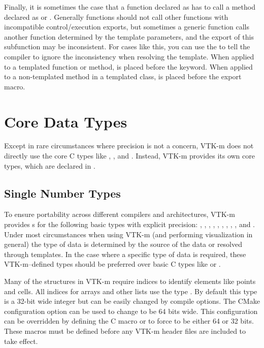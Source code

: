 Finally, it is sometimes the case that a function declared as
\vtkmexeccontexport has to call a method declared as \vtkmexecexport or
\vtkmcontexport. Generally functions should not call other functions with
incompatible control/execution exports, but sometimes a generic
\vtkmexeccontexport function calls another function determined by the
template parameters, and the export of this subfunction may be
inconsistent. For cases like this, you can use the
 to tell the compiler to ignore the
inconsistency when resolving the template. When applied to a templated
function or method,  is placed
before the  keyword. When applied to a non-templated
method in a templated class,  is
placed before the export macro.


\section{Core Data Types}
\label{sec:CoreDataTypes}

Except in rare circumstances where precision is not a concern, VTK-m does
not directly use the core C types like , ,
and . Instead, VTK-m provides its own core types, which
are declared in .

\subsection{Single Number Types}

To ensure portability across different compilers and architectures, VTK-m
provides s for the following basic types with explicit
precision: , , , ,
, , , , , and
. Under most circumstances when using VTK-m (and performing
visualization in general) the type of data is determined by the source of the
data or resolved through templates. In the case where a specific type of
data is required, these VTK-m--defined types should be preferred over basic
C types like  or .

Many of the structures in VTK-m require indices to identify elements like
points and cells. All indices for arrays and other lists use the type
. By default this type is a 32-bit wide integer but can be easily
changed by compile options. The CMake configuration option
 can be used to change  to be 64
bits wide. This configuration can be overridden by defining the C macro
 or  to
force  to be either 64 or 32 bits. These macros must be defined
before any VTK-m header files are included to take effect.

